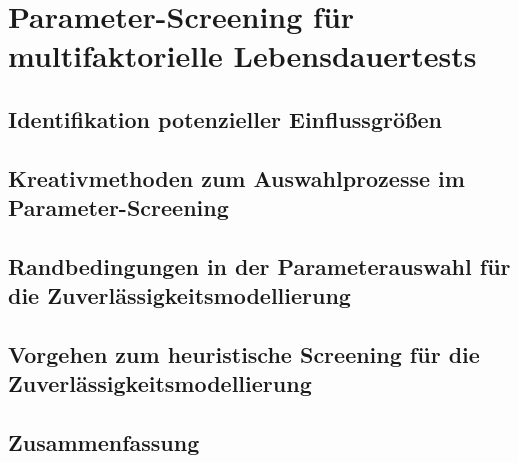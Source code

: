 

\chapter{Parameter-Screening für multifaktorielle Lebensdauertests} \label{chap:screening}

\section{Identifikation potenzieller Einflussgrößen}

\section[\texorpdfstring{Kreativmethoden zum Auswahlprozesse im \\ Parameter-Screening}{Kreativmethoden}]
 {Kreativmethoden zum Auswahlprozesse im Parameter-Screening}


\section{Randbedingungen in der Parameterauswahl für die Zuverlässigkeitsmodellierung}

\section{Vorgehen zum heuristische Screening für die Zuverlässigkeitsmodellierung}

\section{Zusammenfassung}